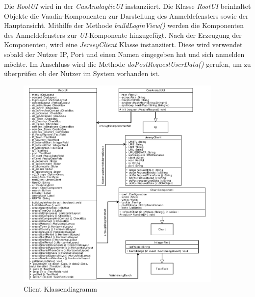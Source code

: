 Die \textit{RootUI} wird in der \textit{CasAnalayticUI} instanziiert. Die Klasse \textit{RootUI} beinhaltet Objekte die Vaadin-Komponenten zur Darstellung des Anmeldefensters sowie der Hauptansicht. Mithilfe der Methode \textit{buildLoginView()} werden die Komponenten des Anmeldefensters zur \textit{UI}-Komponente hinzugefügt. Nach der Erzeugung der Komponenten, wird eine \textit{JerseyClient} Klasse instanziiert. Diese wird verwendet sobald der Nutzer IP, Port und einen Namen eingegeben hat und sich anmelden möchte. Im Anschluss wird die Methode \textit{doPostRequestUserData()} gerufen, um zu überprüfen ob der Nutzer im System vorhanden ist. 

\begin{figure}[htbp]
\begin{center}
\includegraphics[width=0.9\textwidth]{pics/ClientKlassendiagramm.pdf}
\caption{Client Klassendiagramm}
\label{umsetzung_klassendiagramm_client}
\end{center}
\end{figure}

